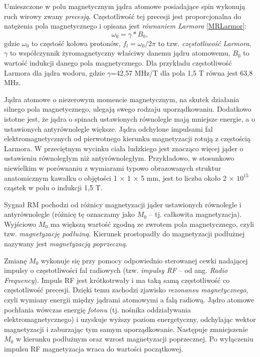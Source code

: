 Umieszczone w polu magnetycznym jądra atomowe posiadające spin wykonują ruch wirowy zwany \textit{precesją}. Częstotliwość tej precesji jest proporcjonalna do natężenia pola magnetycznego i opisana jest \textit{równaniem Larmora} \ref{MRLarmor}:
\begin{equation}
\label{MRLarmor}
\omega_0 = \gamma \ast B_0,
\end{equation}
gdzie $\omega_0$ to częstość kołowa protonów, $f_l = \omega_0/2\pi$ to tzw. \textit{częstotliwość Larmora}, $\gamma$ to współczynnik żyromagnetyczny właściwy danemu jądru atomowemu, $B_0$ to wartość indukcji danego pola magnetycznego. Dla przykładu częstotliwość Larmora dla jądra wodoru, gdzie $\gamma$=42,57 MHz/T dla pola 1,5 T równa jest 63,8 MHz. 

Jądra atomowe o niezerowym momencie magnetycznym, na skutek działania silnego pola magnetycznego, ulegają swego rodzaju uporządkowaniu. Dodatkowo istotne jest, że jądra o spinach ustawionych równolegle mają mniejsze energie, a o ustawionych antyrównolegle większe. Jądra odchylone impulsami fal elektromagnetycznych od pierwotnego kierunku magnetyzacji rotują z częstością Larmora. W przeciętnym wycinku ciała ludzkiego jest znacząco więcej jąder o ustawieniu równoległym niż antyrównoległym. Przykładowo, w stosunkowo niewielkim w porównaniu z wymiarami typowo obrazowanych struktur anatomicznym kawałku o objętości 1 $\times$ 1 $\times$ 5 mm, jest to liczba około 2 $\times$ $10^{15}$ cząstek w polu o indukcji 1,5 T. 

Sygnał RM pochodzi od różnicy magnetyzacji jąder ustawionych równolegle i antyrównolegle (różnicę tę oznaczamy jako $M_0$ -- tj. całkowita magnetyzacja). Wyjściowo $M_0$ ma większą wartość zgodną ze zwrotem pola magnetycznego, czyli tzw. \textit{magnetyzację podłużną}. Kierunek prostopadły do magnetyzacji podłużnej nazywany jest \textit{magnetyzacją poprzeczną}.

Zmianę $M_0$ wykonuje się przy pomocy odpowiednio sterowanej cewki nadającej impulsy o częstotliwości fal radiowych (tzw. \textit{impulsy RF} -- od ang. \textit{Radio Frequency}). Impuls RF jest krótkotrwały i ma taką samą częstotliwość co częstotliwość precesji. Dzięki temu zachodzi zjawisko \textit{rezonansu magnetycznego}, czyli wymiany energii między jądrami atomowymi a falą radiową. Jądro atomowe pochłania wówczas energię \textit{fotonu} (tj. nośnika oddziaływania elektromagnetycznego) i uzyskuje wyższy poziom energetyczny, odchylając wektor magnetyzacji i zaburzając tym samym uporządkowanie. Następuje zmniejszenie $M_0$ w kierunku podłużnym oraz wzrost magnetyzacji poprzecznej. Po wyłączeniu impulsu RF magnetyzacja wraca do wartości początkowej. 

